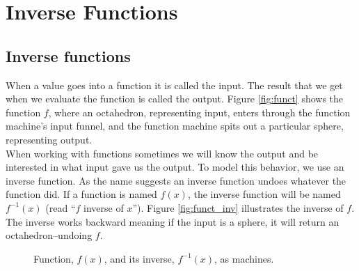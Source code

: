 \chapter{Inverse Functions}
\section{Inverse functions}
When a value goes into a function it is called the input. The result that we get
when we evaluate the function is called the output. Figure \ref{fig:funct} shows the function $f$, where an octahedron, representing input, enters through the function machine's input funnel, and the function machine spits out a particular sphere, representing output.\\
When working with functions
sometimes we will know the output and be interested in what input gave us the
output. To model this behavior, we use an inverse function. As the name suggests an inverse
function undoes whatever the function did. If a function is named $f(x)$, the
inverse function will be named $f^{−1}(x)$ (read “$f$ inverse of $x$”). Figure \ref{fig:funct_inv} illustrates the inverse of $f$. The  inverse works backward meaning if the input is a sphere, it will return an octahedron--undoing $f$.
%
\begin{figure}[ht]
    \centering
    \qquad
    \caption{Function, $f(x)$, and its inverse, $f^{-1}(x)$, as machines.}%
    \label{fig:funct_vs_inv}%
\end{figure}
